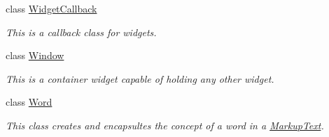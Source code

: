 \begin{DoxyCompactItemize}
class \hyperlink{classMezzanine_1_1UI_1_1WidgetCallback}{WidgetCallback}
\begin{DoxyCompactList}\small\item\em This is a callback class for widgets. \item\end{DoxyCompactList}\item 
class \hyperlink{classMezzanine_1_1UI_1_1Window}{Window}
\begin{DoxyCompactList}\small\item\em This is a container widget capable of holding any other widget. \item\end{DoxyCompactList}\item 
class \hyperlink{classMezzanine_1_1UI_1_1Word}{Word}
\begin{DoxyCompactList}\small\item\em This class creates and encapsultes the concept of a word in a \hyperlink{classMezzanine_1_1UI_1_1MarkupText}{MarkupText}. \item\end{DoxyCompactList}\end{DoxyCompactItemize}
